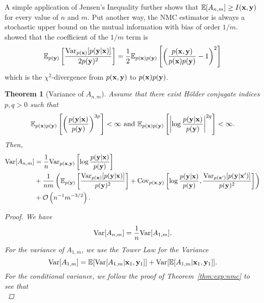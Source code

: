 \documentclass[a4paper, 10pt]{report}
\theoremstyle{plain}
\newtheorem{theorem}{Theorem}[chapter]
\begin{document}
	A simple application of Jensen's Inequality further shows that $\mathbb{E}[A_{n,m}] \ge I({\mathbf{x}},{\mathbf{y}})$ for every value of $n$ and $m$.
	Put another way, the NMC estimator is always a stochastic upper bound on the mutual information with bias of order $1/m$.
	\citet{zheng2018robust} showed that the coefficient of the $1/m$ term is
	\begin{equation}
	\mathbb{E}_{p({\mathbf{y}})}\left[\frac{\mathrm{Var}_{p({\mathbf{x}})}[p({\mathbf{y}}|{\mathbf{x}})]}{{2p({\mathbf{y}})^2}} \right] = \frac{1}{2}\mathbb{E}_{p({\mathbf{x}})p({\mathbf{y}})}\left[ \left( \frac{p({\mathbf{x}},{\mathbf{y}})}{p({\mathbf{x}})p({\mathbf{y}})} - 1 \right)^2\right]
	\end{equation}
	which is the $\chi^2$-divergence from $p({\mathbf{x}},{\mathbf{y}})$ to $p({\mathbf{x}})p({\mathbf{y}})$.
	
	\begin{theorem}[Variance of $A_{n,m}$]
		\label{thm:var:nmc}
		Assume that there exist H\"{o}lder conjugate indices  $p,q > 0$ such that
		\begin{equation}
		\mathbb{E}_{p({\mathbf{x}})p({\mathbf{y}})}\left[\left(\frac{p({\mathbf{y}}|{\mathbf{x}})}{p({\mathbf{y}})}\right)^{3p} \right]<\infty \text{  and  } \mathbb{E}_{p({\mathbf{x}})p({\mathbf{y}})}\left[\left|  \log \frac{p({\mathbf{y}}|{\mathbf{x}})}{p({\mathbf{y}})} \right|^{2q}\right]<\infty.
		\end{equation}
		Then,
		\begin{equation}
		\begin{split}
		\mathrm{Var}[A_{n,m}] &= \frac{1}{n}\mathrm{Var}_{p({\mathbf{x}},{\mathbf{y}})}\left[ \log \frac{p({\mathbf{y}}|{\mathbf{x}})}{p({\mathbf{y}})} \right]
		\\ & + \frac{1}{nm} \left(\mathbb{E}_{p({\mathbf{y}})}\left[\frac{\mathrm{Var}_{p({\mathbf{x}})}[p({\mathbf{y}}|{\mathbf{x}})]}{p({\mathbf{y}})^2} \right] + \mathrm{Cov}_{p({\mathbf{x}},{\mathbf{y}})}\left[\log \frac{p({\mathbf{y}}|{\mathbf{x}})}{p({\mathbf{y}})}, \frac{\mathrm{Var}_{p({\mathbf{x}}')}[p({\mathbf{y}}|{\mathbf{x}}')]}{p({\mathbf{y}})^2}  \right] \right) \\
		& + \mathcal{O}\left(n^{-1}m^{-3/2}\right).
		\end{split}
		\end{equation}
		\begin{proof}
			We have
			\begin{equation}
			\mathrm{Var}[A_{n,m}] = \frac{1}{n}\mathrm{Var}[A_{1,m}].
			\end{equation}
			For the variance of $A_{1,m}$, we use the Tower Law for the Variance
			\begin{equation}
			\mathrm{Var}[A_{1,m}] = \mathbb{E}[\mathrm{Var}[A_{1,m}|{\mathbf{x}}_1,{\mathbf{y}}_1]] + \mathrm{Var}[\mathbb{E}[A_{1,m}|{\mathbf{x}}_1,{\mathbf{y}}_1]].
			\end{equation}
			For the conditional variance, we follow the proof of Theorem~\ref{thm:exp:nmc} to see that
			\begin{equation}
			\label{eq:temp:cond_var}

\end{equation}
\end{proof}
\end{theorem}
\end{document}
